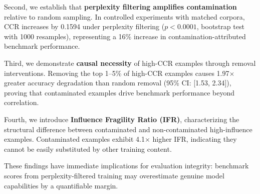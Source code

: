 Second, we establish that \textbf{perplexity filtering amplifies contamination} relative to random sampling. In controlled experiments with matched corpora, CCR increases by 0.1594 under perplexity filtering ($p < 0.0001$, bootstrap test with 1000 resamples), representing a 16\% increase in contamination-attributed benchmark performance.

Third, we demonstrate \textbf{causal necessity} of high-CCR examples through removal interventions. Removing the top 1--5\% of high-CCR examples causes 1.97$\times$ greater accuracy degradation than random removal (95\% CI: [1.53, 2.34]), proving that contaminated examples drive benchmark performance beyond correlation.

Fourth, we introduce \textbf{Influence Fragility Ratio (IFR)}, characterizing the structural difference between contaminated and non-contaminated high-influence examples. Contaminated examples exhibit 4.1$\times$ higher IFR, indicating they cannot be easily substituted by other training content.

These findings have immediate implications for evaluation integrity: benchmark scores from perplexity-filtered training may overestimate genuine model capabilities by a quantifiable margin.
